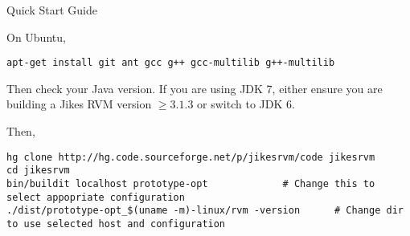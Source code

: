 \begin{chapter}{Quick Start Guide}
\label{cha:quickstartguide}

On Ubuntu,

\begin{lstlisting}
apt-get install git ant gcc g++ gcc-multilib g++-multilib
\end{lstlisting}

Then check your Java version.  If you are using JDK 7, either ensure you are building a Jikes RVM version $\geq 3.1.3$ or switch to JDK 6.

Then, 
\begin{lstlisting}
hg clone http://hg.code.sourceforge.net/p/jikesrvm/code jikesrvm
cd jikesrvm
bin/buildit localhost prototype-opt             # Change this to select appopriate configuration
./dist/prototype-opt_$(uname -m)-linux/rvm -version      # Change dir to use selected host and configuration
\end{lstlisting}

\end{chapter}
